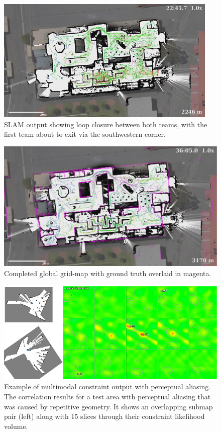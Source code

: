 \begin{figure}[H]
	\centering
	\includegraphics[width=0.8\linewidth]{fig6}
	\caption[SLAM output (loop closure)]{SLAM output showing loop closure between both teams, with the first team about to exit via the southwestern corner.}
	\label{fig:4:slammmid}
\end{figure}

\begin{figure}[H]
	\centering
	\includegraphics[width=0.8\linewidth]{fig8}
	\caption[Completed global grid-map]{Completed global grid-map with ground truth overlaid in magenta.}
	\label{fig:4:slamend}
\end{figure}

\begin{figure}[H]
	\centering
	\includegraphics[width=\linewidth]{fig9}
	\caption[Multimodal constraint output]{Example of multimodal constraint output with perceptual aliasing. The correlation results for a test area with perceptual aliasing that was caused by repetitive geometry. It shows an overlapping submap pair (left) along with 15 slices through their constraint likelihood volume.}
	\label{fig:4:mmc}
\end{figure}

